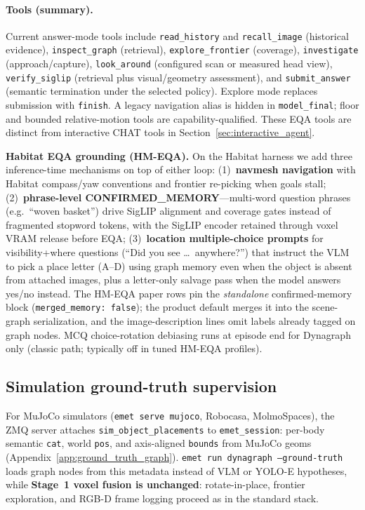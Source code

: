 \paragraph{Tools (summary).}
Current answer-mode tools include \texttt{read\_history} and
\texttt{recall\_image} (historical evidence), \texttt{inspect\_graph}
(retrieval), \texttt{explore\_frontier} (coverage), \texttt{investigate}
(approach/capture), \texttt{look\_around} (configured scan or measured head
view), \texttt{verify\_siglip} (retrieval plus visual/geometry assessment),
and \texttt{submit\_answer} (semantic termination under the selected policy).
Explore mode replaces submission with \texttt{finish}. A legacy navigation alias
is hidden in \texttt{model\_final}; floor and bounded relative-motion tools are
capability-qualified. These EQA tools are distinct from interactive CHAT tools
in Section~\ref{sec:interactive_agent}.

\textbf{Habitat EQA grounding (HM-EQA).}
On the Habitat harness we add three inference-time mechanisms on top of either loop:
(1)~\textbf{navmesh navigation} with Habitat compass/yaw conventions and frontier re-picking when goals stall;
(2)~\textbf{phrase-level CONFIRMED\_MEMORY}---multi-word question phrases (e.g.\ ``woven basket'') drive SigLIP alignment and coverage gates instead of fragmented stopword tokens, with the SigLIP encoder retained through voxel VRAM release before EQA;
(3)~\textbf{location multiple-choice prompts} for visibility+where questions (``Did you see \ldots\ anywhere?'') that instruct the VLM to pick a place letter (A--D) using graph memory even when the object is absent from attached images, plus a letter-only salvage pass when the model answers yes/no instead.
The HM-EQA paper rows pin the \emph{standalone} confirmed-memory block (\texttt{merged\_memory: false}); the product default merges it into the scene-graph serialization, and the image-description lines omit labels already tagged on graph nodes.
MCQ choice-rotation debiasing runs at episode end for Dynagraph only (classic path; typically off in tuned HM-EQA profiles).

\subsection{Simulation ground-truth supervision}
\label{sec:gt_supervision}

For MuJoCo simulators (\texttt{emet serve mujoco}, Robocasa, MolmoSpaces), the ZMQ server attaches \texttt{sim\_object\_placements} to \texttt{emet\_session}: per-body semantic \texttt{cat}, world \texttt{pos}, and axis-aligned \texttt{bounds} from MuJoCo geoms (Appendix~\ref{app:ground_truth_graph}).
\texttt{emet run dynagraph --ground-truth} loads graph nodes from this metadata instead of VLM or YOLO-E hypotheses, while \textbf{Stage~1 voxel fusion is unchanged}: rotate-in-place, frontier exploration, and RGB-D frame logging proceed as in the standard stack.

